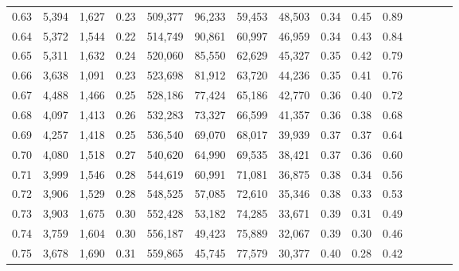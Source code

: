 \begin{tabular}{rrrcrrrrrrrrrrr}
0.63 &   5,394 &  1,627 &                                       0.23 &  509,377 &   96,233 &   59,453 &   48,503 &  0.34 &  0.45 &                         0.89 \\
0.64 &   5,372 &  1,544 &                                       0.22 &  514,749 &   90,861 &   60,997 &   46,959 &  0.34 &  0.43 &                         0.84 \\
0.65 &   5,311 &  1,632 &                                       0.24 &  520,060 &   85,550 &   62,629 &   45,327 &  0.35 &  0.42 &                         0.79 \\
0.66 &   3,638 &  1,091 &                                       0.23 &  523,698 &   81,912 &   63,720 &   44,236 &  0.35 &  0.41 &                         0.76 \\
0.67 &   4,488 &  1,466 &                                       0.25 &  528,186 &   77,424 &   65,186 &   42,770 &  0.36 &  0.40 &                         0.72 \\
0.68 &   4,097 &  1,413 &                                       0.26 &  532,283 &   73,327 &   66,599 &   41,357 &  0.36 &  0.38 &                         0.68 \\
0.69 &   4,257 &  1,418 &                                       0.25 &  536,540 &   69,070 &   68,017 &   39,939 &  0.37 &  0.37 &                         0.64 \\
0.70 &   4,080 &  1,518 &                                       0.27 &  540,620 &   64,990 &   69,535 &   38,421 &  0.37 &  0.36 &                         0.60 \\
0.71 &   3,999 &  1,546 &                                       0.28 &  544,619 &   60,991 &   71,081 &   36,875 &  0.38 &  0.34 &                         0.56 \\
0.72 &   3,906 &  1,529 &                                       0.28 &  548,525 &   57,085 &   72,610 &   35,346 &  0.38 &  0.33 &                         0.53 \\
0.73 &   3,903 &  1,675 &                                       0.30 &  552,428 &   53,182 &   74,285 &   33,671 &  0.39 &  0.31 &                         0.49 \\
0.74 &   3,759 &  1,604 &                                       0.30 &  556,187 &   49,423 &   75,889 &   32,067 &  0.39 &  0.30 &                         0.46 \\
0.75 &   3,678 &  1,690 &                                       0.31 &  559,865 &   45,745 &   77,579 &   30,377 &  0.40 &  0.28 &                         0.42 \\

\end{tabular}
